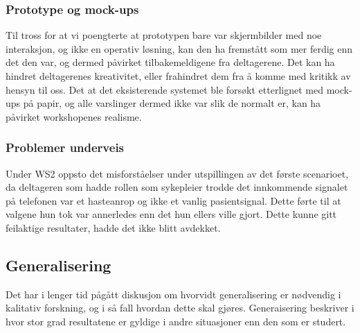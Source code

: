 \subsubsection{Prototype og mock-ups}
Til tross for at vi poengterte at prototypen bare var skjermbilder med noe interaksjon, og ikke en operativ løsning, kan den ha fremstått som mer ferdig enn det den var, og dermed påvirket tilbakemeldigene fra deltagerene. Det kan ha hindret deltagerenes kreativitet, eller frahindret dem fra å komme med kritikk av hensyn til oss. Det at det eksisterende systemet ble forsøkt etterlignet med mock-ups på papir, og alle varslinger dermed ikke var slik de normalt er, kan ha påvirket workshopenes realisme.

\subsubsection{Problemer underveis}
Under WS2 oppsto det misforståelser under utspillingen av det første scenarioet, da deltageren som hadde rollen som sykepleier trodde det innkommende signalet på telefonen var et hasteanrop og ikke et vanlig pasientsignal. Dette førte til at valgene hun tok var annerledes enn det hun ellers ville gjort. Dette kunne gitt feilaktige resultater, hadde det ikke blitt avdekket. 

\subsection{Generalisering}
Det har i lenger tid pågått diskusjon om hvorvidt generalisering er nødvendig i kalitativ forskning, og i så fall hvordan dette skal gjøres. Generaisering beskriver i hvor stor grad resultatene er gyldige i andre situasjoner enn den som er studert. 
